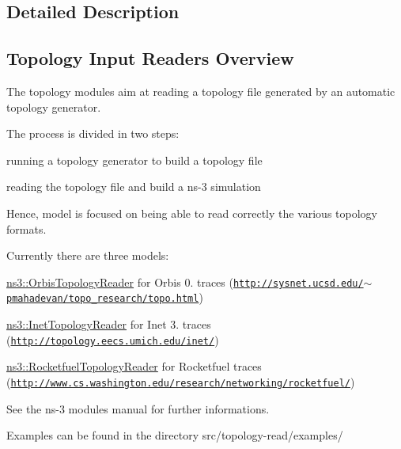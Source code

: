 \subsection{Detailed Description}
\hypertarget{group__topology_topologyOverview}{}\subsection{Topology Input Readers Overview}\label{group__topology_topologyOverview}
The topology modules aim at reading a topology file generated by an automatic topology generator.

The process is divided in two steps\+:
\begin{DoxyItemize}
\item running a topology generator to build a topology file
\item reading the topology file and build a ns-\/3 simulation
\end{DoxyItemize}

Hence, model is focused on being able to read correctly the various topology formats.

Currently there are three models\+:
\begin{DoxyItemize}
\item \hyperlink{classns3_1_1OrbisTopologyReader}{ns3\+::\+Orbis\+Topology\+Reader} for Orbis 0. traces (\href{http://sysnet.ucsd.edu/~pmahadevan/topo_research/topo.html}{\tt http\+://sysnet.\+ucsd.\+edu/$\sim$pmahadevan/topo\+\_\+research/topo.\+html})
\item \hyperlink{classns3_1_1InetTopologyReader}{ns3\+::\+Inet\+Topology\+Reader} for Inet 3. traces (\href{http://topology.eecs.umich.edu/inet/}{\tt http\+://topology.\+eecs.\+umich.\+edu/inet/})
\item \hyperlink{classns3_1_1RocketfuelTopologyReader}{ns3\+::\+Rocketfuel\+Topology\+Reader} for Rocketfuel traces (\href{http://www.cs.washington.edu/research/networking/rocketfuel/}{\tt http\+://www.\+cs.\+washington.\+edu/research/networking/rocketfuel/})
\end{DoxyItemize}

See the ns-\/3 modules manual for further informations.

Examples can be found in the directory src/topology-\/read/examples/ 